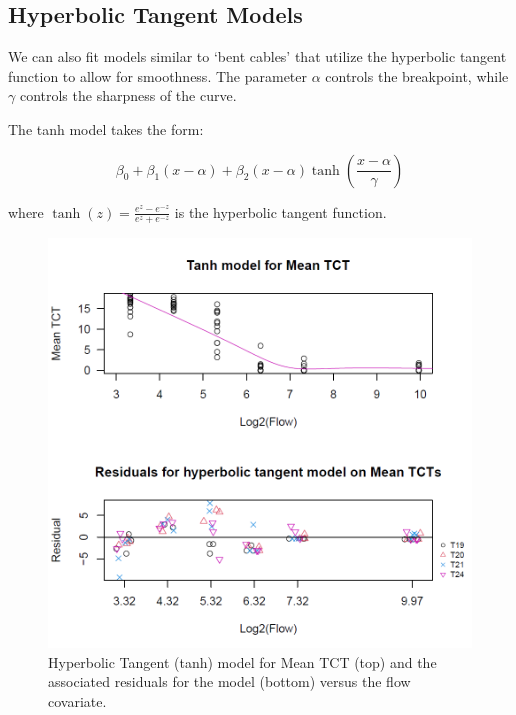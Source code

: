 \newpage

\subsection{Hyperbolic Tangent Models}

We can also fit models similar to `bent cables' that utilize the hyperbolic tangent function to allow for smoothness.  The parameter $\alpha$ controls the breakpoint, while $\gamma$ controls the sharpness of the curve.

\vspace{12pt}
 
The tanh model takes the form:

$$\beta_{0}+\beta_{1}(x-\alpha)+\beta_{2}(x-\alpha)\tanh(\frac{x-\alpha}{\gamma})$$

where $\tanh(z)=\frac{e^{z}-e^{-z}}{e^{z}+e^{-z}}$ is the hyperbolic tangent function.



\begin{figure}[H]
\includegraphics[scale=0.7]{Chapter4Images/tanhmodel.png}
\caption{\hspace{1mm}Hyperbolic Tangent (tanh) model for Mean TCT (top) and the associated residuals for the model (bottom) versus the flow covariate.}
\label{fig:meantanh}
\end{figure}


